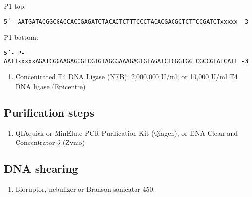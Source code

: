 \documentclass[
  letterpaper,
  DIV=11,
  numbers=noendperiod]{scrreprt}
\providecommand{\tightlist}{%
  \setlength{\itemsep}{0pt}\setlength{\parskip}{0pt}}\usepackage{longtable,booktabs,array}
\begin{document}
\begin{tcolorbox}[enhanced jigsaw, toprule=.15mm, breakable, coltitle=black, leftrule=.75mm, title=\textcolor{quarto-callout-warning-color}{\faExclamationTriangle}\hspace{0.5em}{NOTES}, bottomrule=.15mm, toptitle=1mm, bottomtitle=1mm, colframe=quarto-callout-warning-color-frame, opacityback=0, colback=white, opacitybacktitle=0.6, colbacktitle=quarto-callout-warning-color!10!white, rightrule=.15mm, titlerule=0mm, arc=.35mm, left=2mm]

P1 top:

\begin{verbatim}
5´- AATGATACGGCGACCACCGAGATCTACACTCTTTCCCTACACGACGCTCTTCCGATCTxxxxx -3
\end{verbatim}

P1 bottom:

\begin{verbatim}
5´- P-AATTxxxxxAGATCGGAAGAGCGTCGTGTAGGGAAAGAGTGTAGATCTCGGTGGTCGCCGTATCATT -3
\end{verbatim}

\end{tcolorbox}

\begin{enumerate}
\def\labelenumi{\arabic{enumi}.}
\setcounter{enumi}{3}
\tightlist
\item
  Concentrated T4 DNA Ligase (NEB): 2,000,000 U/ml; or 10,000 U/ml T4
  DNA ligase (Epicentre)
\end{enumerate}

\hypertarget{purification-steps}{%
\subsection{Purification steps}\label{purification-steps}}

\begin{enumerate}
\def\labelenumi{\arabic{enumi}.}
\tightlist
\item
  QIAquick or MinElute PCR Purification Kit (Qiagen), or DNA Clean and
  Concentrator-5 (Zymo)
\end{enumerate}

\hypertarget{dna-shearing}{%
\subsection{DNA shearing}\label{dna-shearing}}

\begin{enumerate}
\def\labelenumi{\arabic{enumi}.}
\tightlist
\item
  Bioruptor, nebulizer or Branson sonicator 450.
\end{enumerate}
\end{document}
